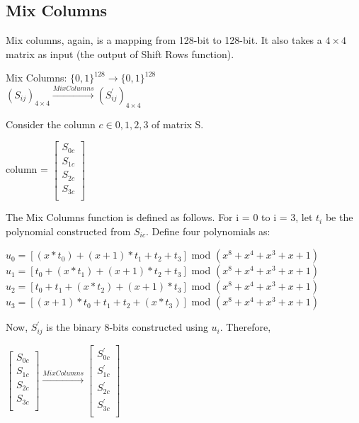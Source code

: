 \documentclass[11pt]{article}
\begin{document}
\subsection{Mix Columns}
Mix columns, again, is a mapping from 128-bit to 128-bit. It also takes a $4 \times 4$ matrix as input (the output of Shift Rows function).
\begin{center}
    Mix Columns: $\{0, 1\}^{128} \rightarrow \{0, 1\}^{128}$\\
    \vspace{1mm}
    $(S_{ij})_{4 \times 4} \xrightarrow{Mix Columns} (S_{ij}^{'})_{4 \times 4}$
\end{center}
Consider the column $c \in {0,1,2,3}$ of matrix S.
\begin{center}
    column = $\begin{bmatrix}
        S_{0c}\\
        S_{1c}\\
        S_{2c}\\
        S_{3c}\\
    \end{bmatrix}$
\end{center}
The Mix Columns function is defined as follows. For i = 0 to i = 3, let $t_i$ be the polynomial constructed from $S_{ic}$. Define four polynomials as:
\begin{center}
    $u_0 = [(x * t_0) + (x + 1) * t_1 + t_2 + t_3]$ mod $(x^8 + x^4 + x^3 + x + 1)$\\
    \vspace{1mm}
    $u_1 = [t_0 + (x * t_1) + (x + 1) * t_2 + t_3]$ mod $(x^8 + x^4 + x^3 + x + 1)$\\
    \vspace{1mm}
    $u_2 = [t_0 + t_1 + (x * t_2) + (x + 1) * t_3]$ mod $(x^8 + x^4 + x^3 + x + 1)$\\
    \vspace{1mm}
    $u_3 = [(x + 1) * t_0 + t_1 + t_2 + (x * t_3)]$ mod $(x^8 + x^4 + x^3 + x + 1)$\\
\end{center}
Now, $S_{ij}^{'}$ is the binary 8-bits constructed using $u_i$. Therefore, 
\begin{center}
    $\begin{bmatrix}
        S_{0c}\\
        S_{1c}\\
        S_{2c}\\
        S_{3c}\\
    \end{bmatrix}
    \xrightarrow{Mix Columns}
    \begin{bmatrix}
        S_{0c}^{'}\\
        S_{1c}^{'}\\
        S_{2c}^{'}\\
        S_{3c}^{'}\\
    \end{bmatrix}$
\end{center}
\end{document}

